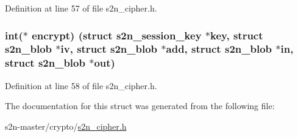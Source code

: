 Definition at line 57 of file s2n\+\_\+cipher.\+h.

\subsubsection[{\texorpdfstring{encrypt}{encrypt}}]{\setlength{\rightskip}{0pt plus 5cm}int($\ast$ encrypt) (struct {\bf s2n\+\_\+session\+\_\+key} $\ast$key, struct {\bf s2n\+\_\+blob} $\ast$iv, struct {\bf s2n\+\_\+blob} $\ast$add, struct {\bf s2n\+\_\+blob} $\ast$in, struct {\bf s2n\+\_\+blob} $\ast$out)}\hypertarget{structs2n__aead__cipher_abd43963674b10a6cb1ce9d83a2d4d2a6}{}\label{structs2n__aead__cipher_abd43963674b10a6cb1ce9d83a2d4d2a6}


Definition at line 58 of file s2n\+\_\+cipher.\+h.



The documentation for this struct was generated from the following file\+:\begin{DoxyCompactItemize}
\item 
s2n-\/master/crypto/\hyperlink{s2n__cipher_8h}{s2n\+\_\+cipher.\+h}\end{DoxyCompactItemize}
